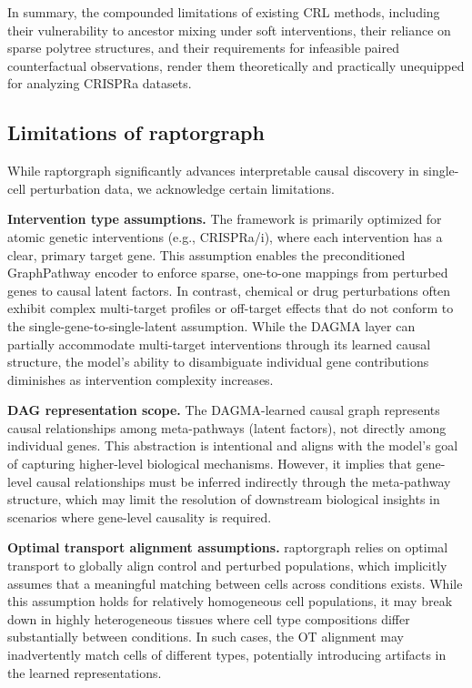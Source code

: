 In summary, the compounded limitations of existing CRL methods, including their vulnerability to ancestor mixing under soft interventions, their reliance on sparse polytree structures, and their requirements for infeasible paired counterfactual observations, render them theoretically and practically unequipped for analyzing CRISPRa datasets.


\subsection{Limitations of \gls{raptorgraph}}
\label{app:crl_methods:raptorgraph_limitations}

While \gls{raptorgraph} significantly advances interpretable causal discovery in single-cell perturbation data, we acknowledge certain limitations.

\textbf{Intervention type assumptions.}
The framework is primarily optimized for atomic genetic interventions (e.g., CRISPRa/i), where each intervention has a clear, primary target gene. This assumption enables the preconditioned GraphPathway encoder to enforce sparse, one-to-one mappings from perturbed genes to causal latent factors. In contrast, chemical or drug perturbations often exhibit complex multi-target profiles or off-target effects that do not conform to the single-gene-to-single-latent assumption. While the DAGMA layer can partially accommodate multi-target interventions through its learned causal structure, the model's ability to disambiguate individual gene contributions diminishes as intervention complexity increases.

\textbf{DAG representation scope.}
The DAGMA-learned causal graph represents causal relationships among meta-pathways (latent factors), not directly among individual genes. This abstraction is intentional and aligns with the model's goal of capturing higher-level biological mechanisms. However, it implies that gene-level causal relationships must be inferred indirectly through the meta-pathway structure, which may limit the resolution of downstream biological insights in scenarios where gene-level causality is required.

\textbf{Optimal transport alignment assumptions.}
\Gls{raptorgraph} relies on optimal transport to globally align control and perturbed populations, which implicitly assumes that a meaningful matching between cells across conditions exists. While this assumption holds for relatively homogeneous cell populations, it may break down in highly heterogeneous tissues where cell type compositions differ substantially between conditions. In such cases, the OT alignment may inadvertently match cells of different types, potentially introducing artifacts in the learned representations.

